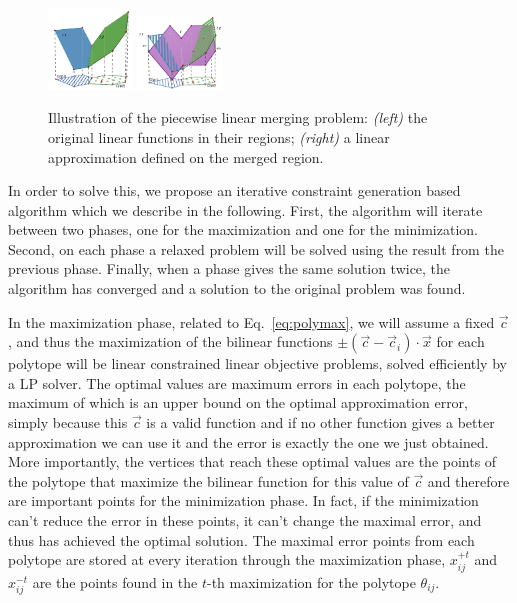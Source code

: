 \begin{figure}[h!t]
\center
\includegraphics[trim = 2cm 0cm 2cm 0cm, height=0.25\textwidth,width=0.2\textwidth]{Figures/optimDiag/optdiagram1.pdf} 
\hspace{2mm}
\includegraphics[trim = 2cm 0cm 2cm 0cm, height=0.25\textwidth,width=0.2\textwidth]{Figures/optimDiag/optdiagram2.pdf}
\caption{Illustration of the piecewise linear merging problem: \emph{(left)} the original linear functions in their regions; \emph{(right)} a linear approximation defined on the merged region.}
\label{fig:optim} 
\end{figure}


In order to solve this, we propose an iterative constraint generation based algorithm which we describe in the following. First, the algorithm will iterate between two phases, one for the maximization and one for the minimization.  Second, on each phase a relaxed problem will be solved using the result from the previous phase. Finally, when a phase gives the same solution twice, the algorithm has converged and a solution to the original problem was found.

In the maximization phase, related to Eq.~\ref{eq:polymax}, we will assume a fixed $\vec{c}$, and thus the maximization of the bilinear functions $\pm(\vec{c} - \vec{c}_i)\cdot \vec{x}$ for each polytope will be linear constrained linear objective problems, solved efficiently by a LP solver. The optimal values are maximum errors in each polytope, the maximum of which is an upper bound on the optimal approximation error, simply because this $\vec{c}$ is a valid function and if no other function gives a better approximation we can use it and the error is exactly the one we just obtained. More importantly, the vertices that reach these optimal values are the points of the polytope that maximize the bilinear function for this value of $\vec{c}$ and therefore are important points for the minimization phase. In fact, if the minimization can't reduce the error in these points, it can't change the maximal error, and thus has achieved the optimal solution. The maximal error points from each polytope are stored at every iteration through the maximization phase, $x^{+t}_{ij}$ and $x^{-t}_{ij}$ are the points found in the $t$-th maximization for the polytope $\theta_{ij}$. 

